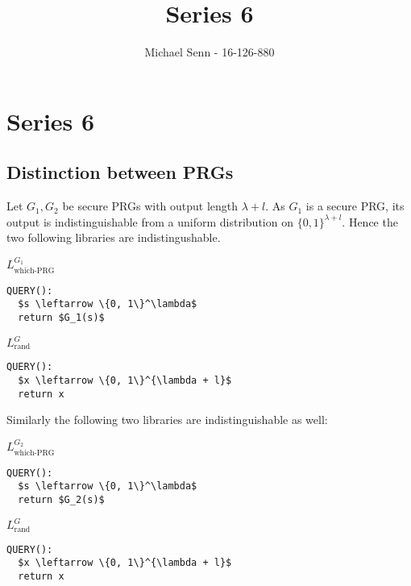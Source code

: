 \documentclass[a4paper]{scrreprt}
\title{Series 6}
\author{Michael Senn \maillink{michael.senn@students.unibe.ch} - 16-126-880}
\date{\printdate}
\begin{document}
\maketitle


\setcounter{chapter}{5}
\chapter{Series 6}

\section{Distinction between PRGs}

Let $G_1, G_2$ be secure PRGs with output length $\lambda + l$. As $G_1$ is a
secure PRG, its output is indistinguishable from a uniform distribution on
$\{0, 1\}^{\lambda +l}$. Hence the two following libraries are
indistingushable.

\begin{tcbraster}[raster columns=2,raster equal height,nobeforeafter,raster column skip=2cm]
	\begin{library}{$L^{G_1}_{\text{which-PRG}}$}
		\begin{lstlisting}[mathescape=true]
QUERY():
  $s \leftarrow \{0, 1\}^\lambda$
  return $G_1(s)$
		  \end{lstlisting}
	\end{library}
	\begin{library}{$L^{G}_{\text{rand}}$}
		\begin{lstlisting}[mathescape=true]
QUERY():
  $x \leftarrow \{0, 1\}^{\lambda + l}$
  return x
  		\end{lstlisting}
	\end{library}
\end{tcbraster}

Similarly the following two libraries are indistinguishable as well:

\begin{tcbraster}[raster columns=2,raster equal height,nobeforeafter,raster column skip=2cm]
	\begin{library}{$L^{G_2}_{\text{which-PRG}}$}
		\begin{lstlisting}[mathescape=true]
QUERY():
  $s \leftarrow \{0, 1\}^\lambda$
  return $G_2(s)$
		  \end{lstlisting}
	\end{library}
	\begin{library}{$L^{G}_{\text{rand}}$}
		\begin{lstlisting}[mathescape=true]
QUERY():
  $x \leftarrow \{0, 1\}^{\lambda + l}$
  return x
  		\end{lstlisting}
	\end{library}
\end{tcbraster}
\end{document}
